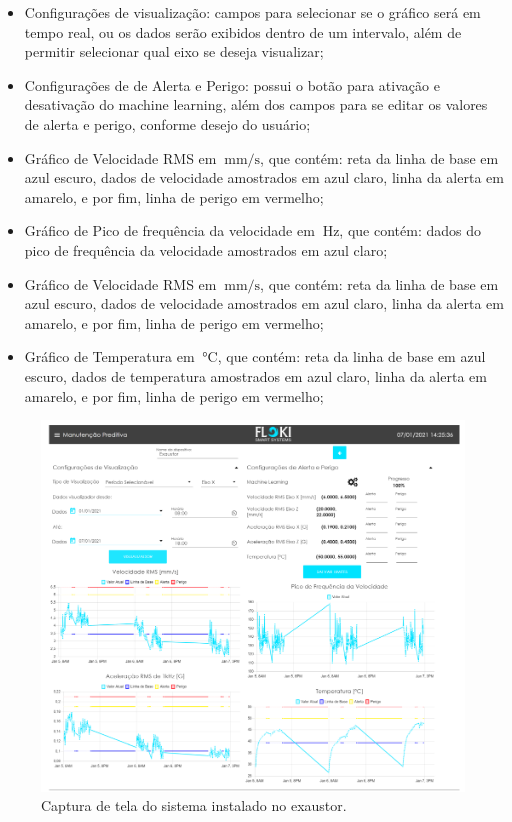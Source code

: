 \begin{itemize}
    \item Configurações de visualização: campos para selecionar se o gráfico será em tempo real, ou os dados serão exibidos dentro de um
intervalo, além de permitir selecionar qual eixo se deseja visualizar;
    \item Configurações de de Alerta e Perigo: possui o botão para ativação e desativação do machine learning, além dos campos para se editar
os valores de alerta e perigo, conforme desejo do usuário;
    \item Gráfico de Velocidade RMS em $\SI{}{\milli\metre\per\second}$, que contém: reta da linha de base em azul escuro, dados de velocidade
amostrados em azul claro, linha da alerta em amarelo, e por fim, linha de perigo em vermelho;
    \item Gráfico de Pico de frequência da velocidade em $\SI{}{\hertz}$, que contém: dados do pico de frequência da velocidade amostrados em azul 
claro; 
    \item Gráfico de Velocidade RMS em $\SI{}{\milli\metre\per\second}$, que contém: reta da linha de base em azul escuro, dados de velocidade
amostrados em azul claro, linha da alerta em amarelo, e por fim, linha de perigo em vermelho;
    \item Gráfico de Temperatura em $\SI{}{\celsius}$, que contém: reta da linha de base em azul escuro, dados de temperatura
amostrados em azul claro, linha da alerta em amarelo, e por fim, linha de perigo em vermelho;
\end{itemize}

\begin{figure}[H]
    \caption{Captura de tela do sistema instalado no exaustor.}
    \begin{center}
        \includegraphics[scale=0.95, page=1]{resultados/img/resultados.pdf}
    \end{center}
    \label{fig:exaustor_1}
\end{figure}

